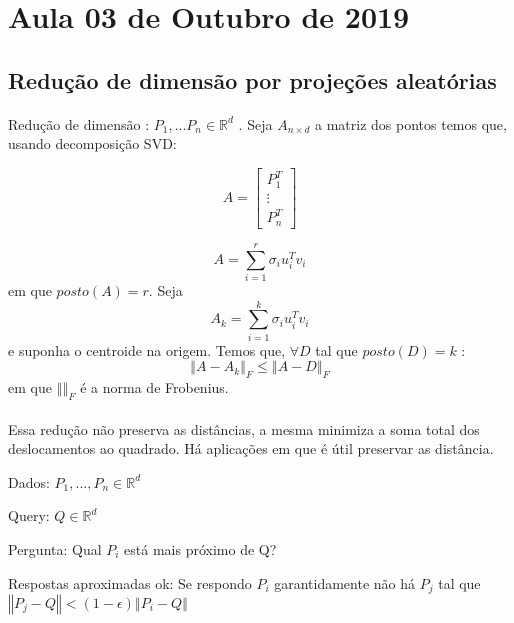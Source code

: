 \section{Aula 03 de Outubro de 2019}
\label{2019_10_03}

\subsection{Redução de dimensão por projeções aleatórias}
\paragraph{} Redução de dimensão : $P_1,...P_n \in \mathbb{R}^d$ . Seja $A_{n \times d}$ a matriz dos pontos temos que, usando decomposição SVD:

\[
A=
  \begin{bmatrix}
    P_1^T \\
    \vdots \\
    P_n^T
  \end{bmatrix}
\]

\begin{equation*}
    A = \sum\limits_{i = 1}^r \sigma_i u_i^T v_i
\end{equation*}
em que $posto(A) = r$. Seja 
\begin{equation*}
    A_k = \sum\limits_{i = 1}^k \sigma_i u_i^T v_i    
\end{equation*}
e suponha o centroide na origem. Temos que, $\forall D$ tal que $ posto(D)=k$ :
\begin{equation*}
    \left\Vert A - A_k \right\Vert_F \leq \left\Vert A - D \right\Vert_F
\end{equation*}
em que $\left\Vert \right\Vert_F$ é a norma de Frobenius.
\paragraph{}Essa redução não preserva as distâncias, a mesma minimiza a soma total dos deslocamentos ao quadrado. Há aplicações em que é útil preservar as distância.
\begin{exemplo}
Dados: $P_1,..., P_n \in \mathbb{R}^d$

Query: $Q \in \mathbb{R}^d$

Pergunta: Qual $P_i$ está mais próximo de Q?

Respostas aproximadas ok: Se respondo $P_i$ garantidamente não há $P_j$ tal que $\left\Vert P_j - Q \right\Vert <(1 - \epsilon) \left\Vert P_i - Q \right\Vert $
\end{exemplo}

